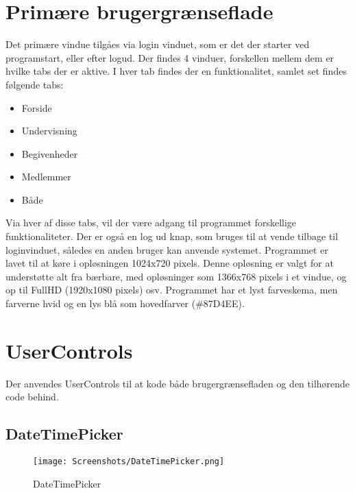 \section{Primære brugergrænseflade}
Det primære vindue tilgåes via login vinduet, som er det der starter ved programstart, eller efter logud. 
Der findes 4 vinduer, forskellen mellem dem er hvilke tabs der er aktive. 
I hver tab findes der en funktionalitet, samlet set findes følgende tabs:
\begin{itemize}%
    \item Forside
    \item Undervisning
    \item Begivenheder
    \item Medlemmer
    \item Både
\end{itemize}

Via hver af disse tabs, vil der være adgang til programmet forskellige funktionaliteter.
Der er også en log ud knap, som bruges til at vende tilbage til loginvinduet, således en anden bruger kan anvende systemet.
Programmet er lavet til at køre i opløsningen 1024x720 pixels.
Denne opløsning er valgt for at understøtte alt fra bærbare, med opløsninger som 1366x768 pixels i et vindue, og op til FullHD (1920x1080 pixels) osv.
Programmet har et lyst farveskema, men farverne hvid og en lys blå som hovedfarver (\#87D4EE).

\section{UserControls}
Der anvendes UserControls til at kode både brugergrænsefladen og den tilhørende code behind.


\subsection{DateTimePicker}\label{subsec:DateTimePicker}

\begin{wrapfigure}{r}{0.5\textwidth}
    \label{img:DateTimePicker}
    \vspace{-20pt}
    \begin{center}
        \texttt{[image: Screenshots/DateTimePicker.png]}
    \end{center}
    \vspace{-15pt}
    \caption{DateTimePicker}
    \vspace{-30pt}
\end{wrapfigure}

